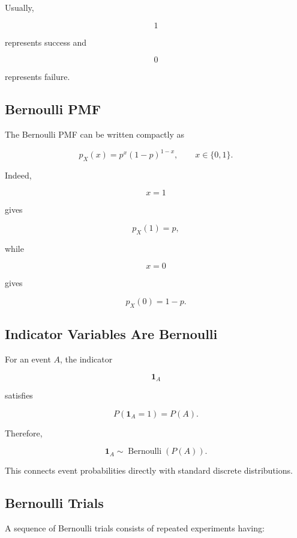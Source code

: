 Usually,

\[
1
\]

represents success and

\[
0
\]

represents failure.

\subsection{Bernoulli PMF}
\label{subsec:bernoulli-pmf}

The Bernoulli PMF can be written compactly as

\[
\boxed{
p_X(x)
=
p^x(1-p)^{1-x},
\qquad
x\in\{0,1\}.
}
\]

Indeed,

\[
x=1
\]

gives

\[
p_X(1)=p,
\]

while

\[
x=0
\]

gives

\[
p_X(0)=1-p.
\]

\subsection{Indicator Variables Are Bernoulli}
\label{subsec:indicator-bernoulli}

For an event \(A\), the indicator

\[
\mathbf{1}_A
\]

satisfies

\[
P(\mathbf{1}_A=1)=P(A).
\]

Therefore,

\[
\boxed{
\mathbf{1}_A
\sim
\operatorname{Bernoulli}(P(A)).
}
\]

This connects event probabilities directly with standard discrete
distributions.

\subsection{Bernoulli Trials}
\label{subsec:bernoulli-trials}

A sequence of Bernoulli trials consists of repeated experiments having:

